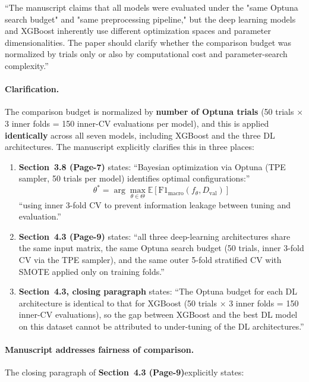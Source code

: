 \documentclass[11pt,a4paper]{article}
\newcommand{\sectref}[1]{Section~#1}
\newcommand{\stress}[1]{\textbf{#1}}
\begin{document}
\begin{reviewerquote}
``The manuscript claims that all models were evaluated under the "same Optuna search budget" and "same preprocessing pipeline," but the deep learning models and XGBoost inherently use different optimization spaces and parameter dimensionalities. The paper should clarify whether the comparison budget was normalized by trials only or also by computational cost and parameter-search complexity.''
\end{reviewerquote}

\paragraph{Clarification.} The comparison budget is normalized by \stress{number of Optuna trials} (50 trials $\times$ 3 inner folds = 150 inner-CV evaluations per model), and this is applied \stress{identically} across all seven models, including XGBoost and the three DL architectures. The manuscript explicitly clarifies  this  in three places:

\begin{enumerate}
  \item \stress{\sectref{3.8} (Page-7)} states: ``Bayesian optimization via Optuna (TPE sampler, 50 trials per model) identifies optimal configurations:''
  \[
  \theta^* = \arg\max_{\theta \in \Theta} \mathbb{E}[\text{F1}_\text{macro}(f_\theta, D_\text{val})]
  \]
  ``using inner 3-fold CV to prevent information leakage between tuning and evaluation.''
  \item \stress{\sectref{4.3} (Page-9)} states: ``all three deep-learning architectures share the same input matrix, the same Optuna search budget (50 trials, inner 3-fold CV via the TPE sampler), and the same outer 5-fold stratified CV with SMOTE applied only on training folds.''
  \item \stress{\sectref{4.3}, closing paragraph} states: ``The Optuna budget for each DL architecture is identical to that for XGBoost (50 trials $\times$ 3 inner folds = 150 inner-CV evaluations), so the gap between XGBoost and the best DL model on this dataset cannot be attributed to under-tuning of the DL architectures.''
\end{enumerate}


\paragraph{Manuscript  addresses fairness of comparison.} The closing paragraph of \stress{\sectref{4.3 (Page-9)}}explicitly states:
\end{document}
